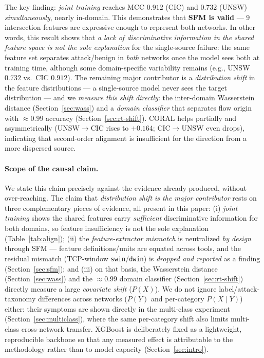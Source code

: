 \documentclass[preprint,12pt,authoryear]{elsarticle}
\begin{document}
The key finding: \emph{joint training} reaches MCC $0.912$ (CIC) and $0.732$
(UNSW) \emph{simultaneously}, nearly in-domain. This demonstrates that \textbf{SFM
is valid} --- 9 intersection features are expressive enough to represent both
networks. In
other words, this result shows that \emph{a lack of discriminative information in
the shared feature space is not the sole explanation} for the single-source
failure: the same feature set separates attack/benign in \emph{both} networks once
the model sees both at training time, although some domain-specific variability
remains (e.g., UNSW $0.732$ vs.\ CIC $0.912$). The remaining major contributor is a
\emph{distribution shift} in the feature distributions --- a single-source model
never sees the target distribution --- and we \emph{measure this shift directly}:
the inter-domain Wasserstein distance (Section~\ref{sec:wass}) and a
\emph{domain classifier} that separates flow origin with $\approx 0.99$ accuracy
(Section~\ref{sec:rt-shift}). CORAL helps partially and asymmetrically
(UNSW$\rightarrow$CIC rises to $+0.164$; CIC$\rightarrow$UNSW even drops),
indicating that second-order alignment is insufficient for the direction from a
more dispersed source.

\paragraph{Scope of the causal claim.} We state this claim precisely against the
evidence already produced, without over-reaching. The claim that
\emph{distribution shift is the major contributor} rests on three complementary
pieces of evidence, all present in this paper: (i) \emph{joint training} shows the
shared features carry \emph{sufficient} discriminative information for both domains,
so feature insufficiency is not the sole explanation
(Table~\ref{tab:align}); (ii) the \emph{feature-extractor mismatch} is neutralized
\emph{by design} through SFM --- feature definitions/units are equated across tools,
and the residual mismatch (TCP-window \texttt{swin}/\texttt{dwin}) is \emph{dropped
and reported} as a finding (Section~\ref{sec:sfm}); and (iii) on that basis, the
Wasserstein distance (Section~\ref{sec:wass}) and the $\approx 0.99$ domain
classifier (Section~\ref{sec:rt-shift}) directly measure a large \emph{covariate
shift} ($P(X)$). We do not ignore label/attack-taxonomy differences across networks
($P(Y)$ and per-category $P(X\mid Y)$) either: their symptoms are shown directly in
the multi-class experiment (Section~\ref{sec:multiclass}), where the same
per-category shift also limits multi-class cross-network transfer. XGBoost is
deliberately fixed as a lightweight, reproducible backbone so that any measured
effect is attributable to the methodology rather than to model capacity
(Section~\ref{sec:intro}).
\end{document}
